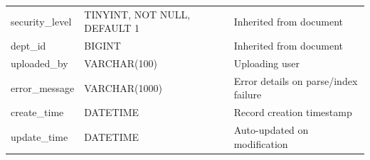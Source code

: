 \begin{table}[H]
\begin{tabular}{@{}p{3cm}p{3.5cm}p{\dimexpr\textwidth-6.5cm-4\tabcolsep\relax}@{}}
security\_level    & TINYINT, NOT NULL, DEFAULT 1         & Inherited from document \\
dept\_id           & BIGINT                               & Inherited from document \\
uploaded\_by       & VARCHAR(100)                         & Uploading user \\
error\_message     & VARCHAR(1000)                        & Error details on parse/index failure \\
create\_time       & DATETIME                             & Record creation timestamp \\
update\_time       & DATETIME                             & Auto-updated on modification \\
\bottomrule
\end{tabular}
\end{table}

\vspace{2mm}

